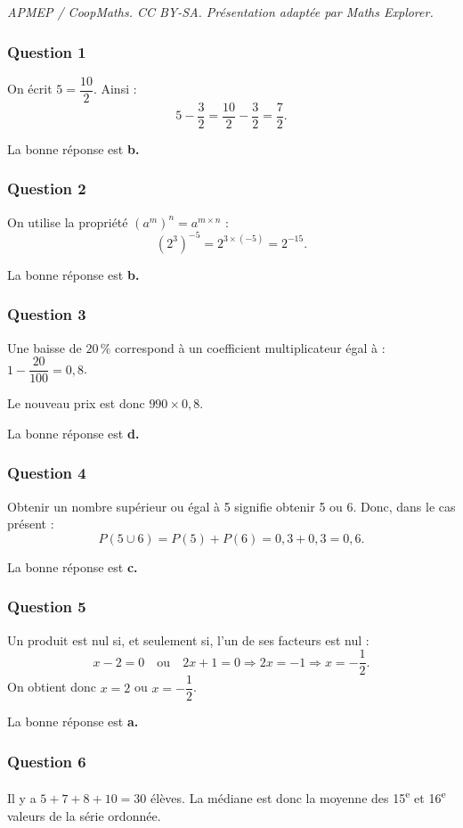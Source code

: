 \documentclass[10pt]{article}
\providecommand{\ieme}{\textsuperscript{e}}
\begin{document}
\noindent\textit{APMEP / CoopMaths. CC BY-SA. Présentation adaptée par Maths Explorer.}\par\medskip
\subsubsection*{Question 1}
On écrit $5=\dfrac{10}{2}$. Ainsi :
\[5-\dfrac{3}{2}=\dfrac{10}{2}-\dfrac{3}{2}=\dfrac{7}{2}.\]

La bonne réponse est \textbf{b.}

\subsubsection*{Question 2}
On utilise la propriété $(a^m)^n=a^{m \times n}$ :
\[\left(2^3\right)^{-5}=2^{3\times(-5)}=2^{-15}.\]

La bonne réponse est \textbf{b.}

\subsubsection*{Question 3}
Une baisse de $20\,\%$ correspond à un coefficient multiplicateur égal à : $1-\dfrac{20}{100}=0{,}8$.

Le nouveau prix est donc $990\times 0{,}8$.

La bonne réponse est \textbf{d.}

\subsubsection*{Question 4}
Obtenir un nombre supérieur ou égal à 5 signifie obtenir 5 ou 6. Donc, dans le cas présent :
\[P(5 \cup 6)=P(5)+P(6)=0{,}3+0{,}3=0{,}6.\]

La bonne réponse est \textbf{c.}

\subsubsection*{Question 5}
Un produit est nul si, et seulement si, l'un de ses facteurs est nul :
\[x-2=0 \quad \text{ou} \quad 2x+1=0 \Rightarrow 2x=-1 \Rightarrow x=-\dfrac{1}{2}.\]
On obtient donc $x=2$ ou $x=-\dfrac{1}{2}$.

La bonne réponse est \textbf{a.}

\subsubsection*{Question 6}
Il y a $5+7+8+10=30$ élèves. La médiane est donc la moyenne des 15\ieme{} et 16\ieme{} valeurs de la série ordonnée.
\end{document}
